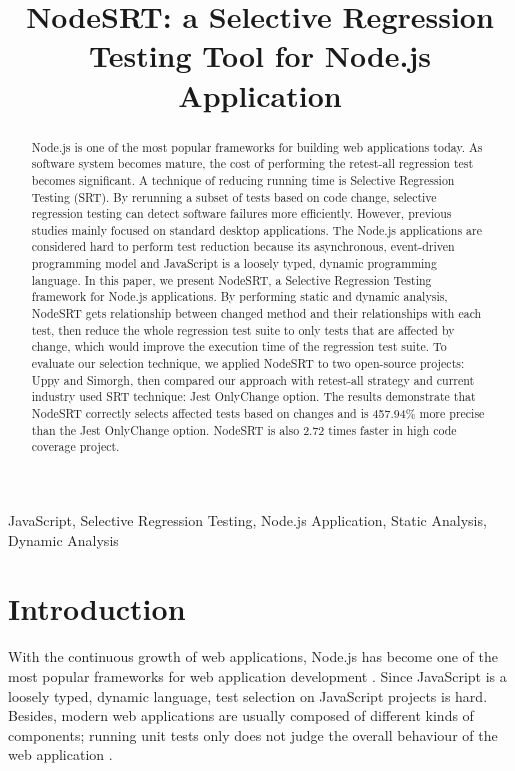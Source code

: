 \documentclass[10pt, conference]{IEEEtran}
\begin{document}
\title{NodeSRT: a Selective Regression Testing Tool for Node.js Application}

\author{
}

\maketitle

\begin{abstract}
Node.js is one of the most popular frameworks for building web applications today. As software system 
becomes mature, the cost of performing the retest-all regression test becomes significant. A technique 
of reducing running time is Selective Regression Testing (SRT). By rerunning a subset of tests based on 
code change, selective regression testing can detect software failures more efficiently. However, 
previous studies mainly focused on standard desktop applications. The Node.js applications are 
considered hard to perform test reduction because its asynchronous, event-driven programming model and 
JavaScript is a loosely typed, dynamic programming language. 
In this paper, we present NodeSRT, a Selective Regression Testing framework for Node.js applications. 
By performing static and dynamic analysis, NodeSRT gets relationship between changed method and their 
relationships with each test, then reduce the whole regression test suite to only tests that are 
affected by change, which would improve the execution time of the regression test suite. 
To evaluate our selection technique, we applied NodeSRT to two open-source projects: Uppy and Simorgh, 
then compared our approach with retest-all strategy and current industry used SRT technique: Jest 
OnlyChange option. The results demonstrate that NodeSRT correctly selects affected tests based on 
changes and is 457.94\% more precise than the Jest OnlyChange option. NodeSRT is also 2.72 times faster in 
high code coverage project.
    
\end{abstract}

\begin{IEEEkeywords}
JavaScript, Selective Regression Testing, Node.js Application, Static Analysis, Dynamic Analysis
\end{IEEEkeywords}

\section{Introduction}
With the continuous growth of web applications, Node.js has become one of the most popular frameworks 
for web application development \cite{b16}. Since JavaScript is a loosely typed, dynamic language, test 
selection on JavaScript projects is hard. Besides, modern web applications are usually composed of 
different kinds of components; running unit tests only does not judge the overall behaviour of the web 
application \cite{b8}. 
\end{document}
